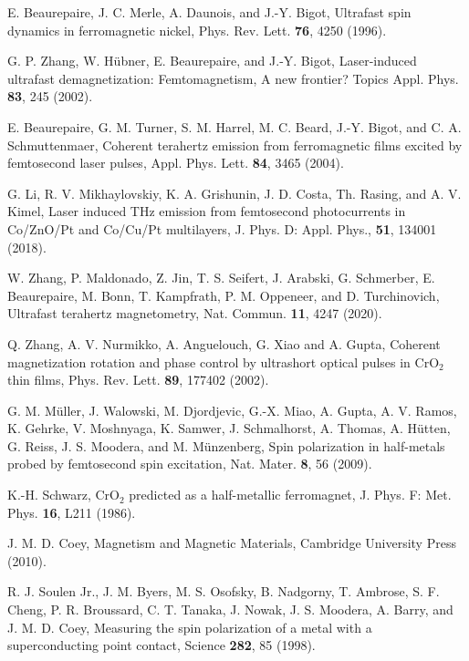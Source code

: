 \documentclass[checkin,showpacs,psfig,aps,pra]{revtex4}
\begin{document}
\begin{thebibliography}{99}
 E. Beaurepaire, J. C. Merle, A. Daunois, and J.-Y. Bigot,
{Ultrafast spin dynamics in ferromagnetic nickel},
Phys.  Rev. Lett. {\bf 76}, 4250 (1996).

G. P. Zhang, W. H\"ubner, E.  Beaurepaire, and
J.-Y. Bigot, Laser-induced ultrafast demagnetization: Femtomagnetism,
A new frontier? Topics Appl. Phys.  {\bf 83}, 245 (2002).

 E. Beaurepaire, G. M. Turner, S. M. Harrel,
M. C. Beard, J.-Y. Bigot, and C. A. Schmuttenmaer, Coherent
terahertz emission from ferromagnetic films excited by femtosecond
laser pulses, Appl. Phys. Lett. {\bf 84}, 3465 (2004).

G. Li, R. V. Mikhaylovskiy, K. A. Grishunin,
J. D. Costa, Th. Rasing, and A. V. Kimel, {Laser induced THz
emission from femtosecond photocurrents in {Co/ZnO/Pt} and {Co/Cu/Pt}
multilayers},  J. Phys. D: Appl. Phys., {\bf 51}, 134001 (2018).

W. Zhang, P. Maldonado, Z. Jin,
T. S. Seifert, J. Arabski, G. Schmerber, E.
Beaurepaire, M. Bonn, T. Kampfrath, P. M. Oppeneer, and
D. Turchinovich, {Ultrafast terahertz magnetometry},
Nat. Commun. {\bf 11}, 4247 (2020).

Q. Zhang, A. V. Nurmikko, A. Anguelouch, G. Xiao and
A. Gupta, {Coherent magnetization rotation and phase control by
ultrashort optical pulses in CrO$_2$ thin films},
Phys. Rev. Lett. {\bf 89}, 177402 (2002).

G. M. M\"uller, J. Walowski, M.  Djordjevic,
G.-X. Miao, A. Gupta, A. V. Ramos, K. Gehrke, V. Moshnyaga,
K. Samwer, J. Schmalhorst, A. Thomas, A. H\"utten, G.  Reiss,
J. S. Moodera, and M. M\"unzenberg, {Spin polarization in
half-metals probed by femtosecond spin excitation},
Nat. Mater. {\bf 8}, 56 (2009).

K.-H.  Schwarz, {CrO$_2$ predicted as a
half-metallic ferromagnet}, J. Phys. F: Met. Phys. {\bf 16}, L211
(1986).

J. M. D. Coey, {Magnetism and Magnetic Materials},
Cambridge University Press (2010).

 R. J. Soulen Jr., J. M. Byers, M. S. Osofsky,
B. Nadgorny, T. Ambrose, S. F. Cheng, P. R. Broussard, C. T. Tanaka,
J. Nowak, J. S. Moodera, A. Barry, and J. M. D. Coey, {Measuring the
spin polarization of a metal with a superconducting point
contact}, Science {\bf 282}, 85 (1998).


\end{thebibliography}
\end{document}
